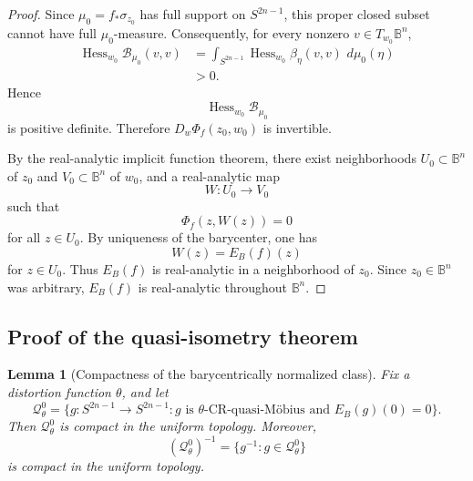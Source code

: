 \documentclass[11pt]{article}
\newcommand{\Hess}{\operatorname{Hess}}
\newtheorem{lemma}[theorem]{Lemma}
\theoremstyle{definition}
\theoremstyle{remark}
\theoremstyle{definition}
\newcommand{\B}{\mathbb B}
\newcommand{\dd}{\,d}
\begin{document}
\begin{proof}
Since \(\mu_0=f_*\sigma_{z_0}\) has full support on \(S^{2n-1}\), this proper
closed subset cannot have full \(\mu_0\)-measure. Consequently, for every
nonzero \(v\in T_{w_0}\B^n\),
\[
\begin{aligned}
        \Hess_{w_0}\mathcal B_{\mu_0}(v,v)
        &=
        \int_{S^{2n-1}}
        \Hess_{w_0}\beta_\eta(v,v)\,\dd\mu_0(\eta)  \\
        &>0.
\end{aligned}
\]
Hence
\[
        \Hess_{w_0}\mathcal B_{\mu_0}
\]
is positive definite. Therefore \(D_w\Phi_f(z_0,w_0)\) is invertible.

By the real-analytic implicit function theorem, there exist neighborhoods
\(U_0\subset\B^n\) of \(z_0\) and \(V_0\subset\B^n\) of \(w_0\), and a
real-analytic map
\[
        W:U_0\to V_0
\]
such that
\[
        \Phi_f(z,W(z))=0
\]
for all \(z\in U_0\). By uniqueness of the barycenter, one has
\[
        W(z)=E_B(f)(z)
\]
for \(z\in U_0\). Thus \(E_B(f)\) is real-analytic in a neighborhood of
\(z_0\). Since \(z_0\in\B^n\) was arbitrary, \(E_B(f)\) is real-analytic
throughout \(\B^n\).
\end{proof}

\subsection{Proof of the quasi-isometry theorem}
\label{section-general-quasi-isometry}

\begin{lemma}[Compactness of the barycentrically normalized class]
\label{lemma-normalized-qm-compactness}
Fix a distortion function \(\theta\), and let
\[
        \mathcal Q_\theta^0
        =\{g:S^{2n-1}\to S^{2n-1}:
        g\text{ is }\theta\text{-CR-quasi-M\"obius and }E_B(g)(0)=0\}.
\]
Then \(\mathcal Q_\theta^0\) is compact in the uniform topology.  Moreover,
\[
        (\mathcal Q_\theta^0)^{-1}
        =\{g^{-1}:g\in\mathcal Q_\theta^0\}
\]
is compact in the uniform topology.
\end{lemma}
\end{document}
